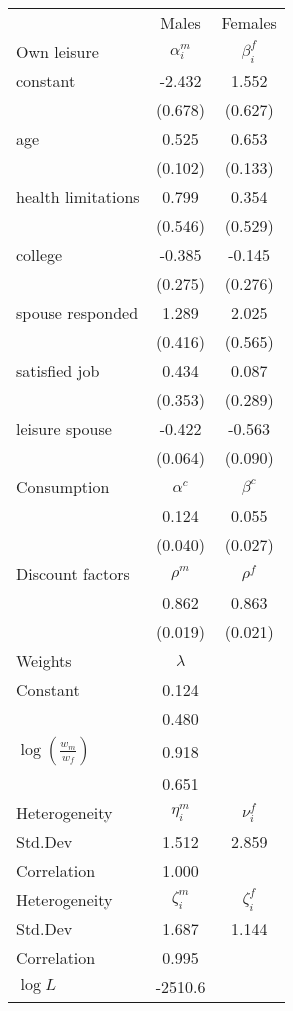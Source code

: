 \begin{tabular}{lcc} 
\hline\hline 
 & Males & Females \\ 
Own leisure & $\alpha_{i}^{m}$ & $\beta_{i}^{f}$ \\ 
constant & -2.432 & 1.552 \\ 
 & (0.678) & (0.627) \\ 
age & 0.525 & 0.653 \\ 
 & (0.102) & (0.133) \\ 
health limitations & 0.799 & 0.354 \\ 
 & (0.546) & (0.529) \\ 
college & -0.385 & -0.145 \\ 
 & (0.275) & (0.276) \\ 
spouse responded & 1.289 & 2.025 \\ 
 & (0.416) & (0.565) \\ 
satisfied job & 0.434 & 0.087 \\ 
 & (0.353) & (0.289) \\ 
leisure spouse & -0.422 & -0.563 \\ 
 & (0.064) & (0.090) \\ 
Consumption & $\alpha^{c}$ & $\beta^{c}$ \\ 
 & 0.124 & 0.055 \\ 
 & (0.040) & (0.027) \\ 
Discount factors & $\rho^m$ & $\rho^f$ \\ 
 & 0.862 & 0.863 \\ 
 & (0.019) & (0.021) \\ 
Weights & $\lambda$ &  \\ 
Constant & 0.124 &  \\ 
 & 0.480 &  \\ 
$\log(\frac{w_m}{w_f})$ & 0.918 &  \\ 
 & 0.651 &  \\ 
Heterogeneity & $\eta_i^m$ & $\nu_i^f$ \\ 
Std.Dev & 1.512 & 2.859 \\ 
Correlation & 1.000 &  \\ 
Heterogeneity & $\zeta_i^m$ & $\zeta_i^f$ \\ 
Std.Dev & 1.687 & 1.144 \\ 
Correlation & 0.995 &  \\ 
\hline 
$\log L$ & -2510.6 & \\ 
\hline \hline 
\end{tabular} 
